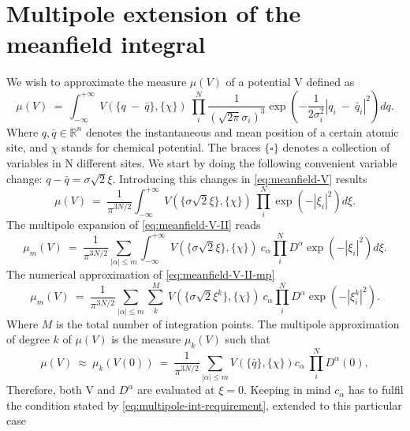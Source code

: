\documentclass[11pt,a4paper]{article}
\begin{document}
\section{Multipole extension of the meanfield integral} 
 
We wish to approximate the measure $\mu(V)$ of a potential V defined as
\begin{equation}
\label{eq:meanfield-V}
\mu(V)\ =\ \int_{-\infty}^{+\infty}\ V(\{q\ -\ \bar{q}\},\{\chi\})\ \prod^{N}_{i} \frac{1}{(\sqrt{2\pi}\sigma_i)^3} \exp \left(- \frac{1}{2\sigma_i^2} |q_{i}\ -\ \bar{q}_{i}|^2\right) dq.
\end{equation} 
Where $q, \bar{q} \in \mathbb{R}^n$ denotes the instantaneous and mean position of a certain atomic site,  and $\chi$ stands for chemical potential.  The braces $\{\square\}$ denotes a collection of variables in N different sites.
We start by doing the following  convenient variable change: $q - \bar{q} = \sigma\sqrt{2}\xi$. Introducing this changes in \cref{eq:meanfield-V}  results
\begin{equation} \label{eq:meanfield-V-II}
\mu(V)\ =\ \frac{1}{\pi^{3N/2}} \int_{-\infty}^{+\infty}\ V(\{\sigma\sqrt{2}\xi\},\{\chi\})\ \prod^{N}_{i} \exp \left(-|\xi_{i}|^2\right) d\xi.
\end{equation}
The multipole expansion of \cref{eq:meanfield-V-II} reads
\begin{equation} \label{eq:meanfield-V-II-mp}
\mu_m(V)\ =\ \frac{1}{\pi^{3N/2}} \sum_{|\alpha|\leq m} \int_{-\infty}^{+\infty}\ V(\{\sigma\sqrt{2}\xi\},\{\chi\})\ c_{\alpha} \prod^{N}_{i} D^{\alpha} \exp \left(-|\xi_{i}|^2\right) d\xi.
\end{equation}
The numerical approximation of \cref{eq:meanfield-V-II-mp}
\begin{equation} \label{eq:meanfield-V-III-mp}
    \mu_m(V)\ =\ \frac{1}{\pi^{3N/2}} \sum_{|\alpha|\leq m} \sum_{k}^{M}\ V(\{\sigma\sqrt{2}\xi^k\},\{\chi\})\ c_{\alpha} \prod^{N}_{i} D^{\alpha} \exp \left(-|\xi_{i}^{k}|^2\right).
\end{equation}
Where $M$ is the total number of integration points. The multipole approximation of degree $k$ of $\mu(V)$ is the measure $\mu_k(V)$ such that
\begin{equation} \label{eq:meanfield-V-IV-mp}
    \mu(V)\ \approx\ \mu_k(V(0))\ =\ \frac{1}{\pi^{3N/2}} \sum_{|\alpha| \leq m} V(\{\bar{q}\},\{\chi\}) c_{\alpha}\ \prod^{N}_{i} D^{\alpha} \left(0\right),
\end{equation}
Therefore, both V and $D^{\alpha}$ are evaluated at $\xi = 0$. Keeping in mind $c_{\alpha}$ has to fulfil the condition stated by \cref{eq:multipole-int-requirement},  extended to this particular case
\end{document}
